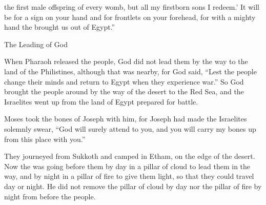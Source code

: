 {the first male
offspring
of every
womb,
but all
my firstborn
sons
I redeem.’
It will be
for a sign
on
your hand
and for frontlets
on your forehead,
for
with a mighty
hand
the {}
brought us out
of Egypt.”
\par }{\SH The Leading of God
\par }{\PP {}When
Pharaoh
released
the
people,
God
did not
lead
them by the way
to the land
of the Philistines,
although
that was
nearby,
for
God
said, “Lest
the people
change
their minds and return
to Egypt
when
they experience
war.”
So God
brought
the people
around
by the way
of the desert
to the Red
Sea,
and the Israelites
went up
from the land
of Egypt
prepared for battle.
\par }{\PP {}Moses
took
the
bones
of Joseph
with
him, for
Joseph had made
the Israelites
solemnly
swear, “God
will surely attend
to you, and you will carry my bones
up
from this
place with you.”
\par }{\PP {}They journeyed
from Sukkoth
and camped
in Etham,
on the edge
of the desert.
Now the
{}
was going
before
them by day
in a pillar
of cloud
to lead
them in the way,
and by night
in a pillar
of fire
to give them light,
so
that they could travel
day
or night.
He did not
remove
the pillar
of cloud
by day
nor the pillar
of fire
by night
from before
the people.


}
